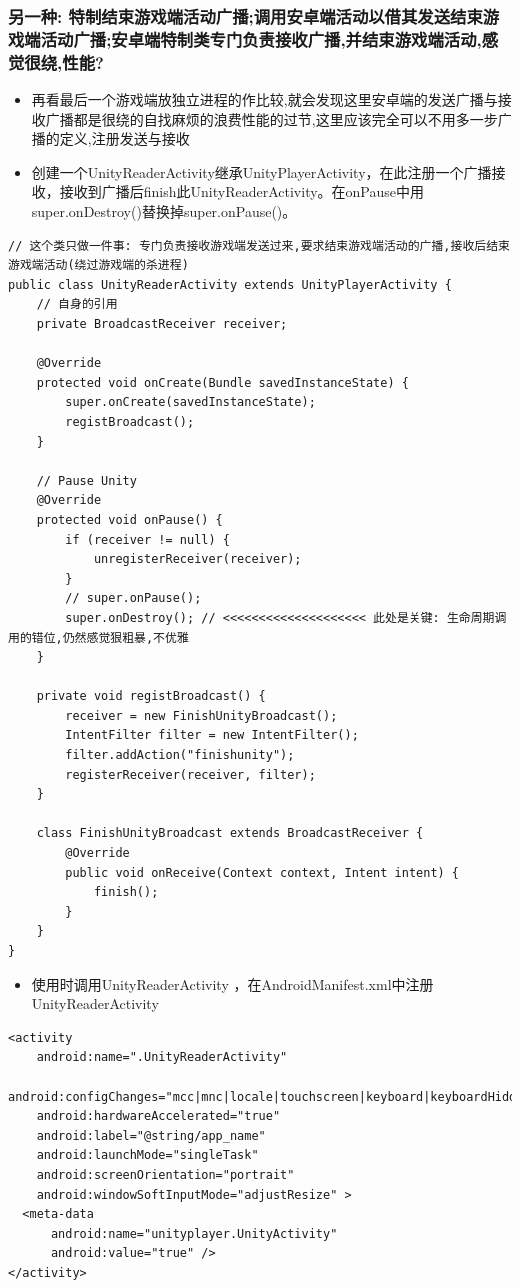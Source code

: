 \documentclass[9pt, b5paper]{article}
\begin{document}
\subsubsection{另一种: 特制结束游戏端活动广播;调用安卓端活动以借其发送结束游戏端活动广播;安卓端特制类专门负责接收广播,并结束游戏端活动,感觉很绕,性能?}
\label{sec-1-2-4}
\begin{itemize}
\item 再看最后一个游戏端放独立进程的作比较,就会发现这里安卓端的发送广播与接收广播都是很绕的自找麻烦的浪费性能的过节,这里应该完全可以不用多一步广播的定义,注册发送与接收
\item 创建一个UnityReaderActivity继承UnityPlayerActivity，在此注册一个广播接收，接收到广播后finish此UnityReaderActivity。在onPause中用super.onDestroy()替换掉super.onPause()。
\end{itemize}
\begin{verbatim}
// 这个类只做一件事: 专门负责接收游戏端发送过来,要求结束游戏端活动的广播,接收后结束游戏端活动(绕过游戏端的杀进程)
public class UnityReaderActivity extends UnityPlayerActivity {
    // 自身的引用
    private BroadcastReceiver receiver;
 
    @Override
    protected void onCreate(Bundle savedInstanceState) {
        super.onCreate(savedInstanceState);
        registBroadcast();
    }
 
    // Pause Unity
    @Override
    protected void onPause() {
        if (receiver != null) {
            unregisterReceiver(receiver);
        }
        // super.onPause();
        super.onDestroy(); // <<<<<<<<<<<<<<<<<<<< 此处是关键: 生命周期调用的错位,仍然感觉狠粗暴,不优雅
    }
  
    private void registBroadcast() {
        receiver = new FinishUnityBroadcast();
        IntentFilter filter = new IntentFilter();
        filter.addAction("finishunity");
        registerReceiver(receiver, filter);
    }
 
    class FinishUnityBroadcast extends BroadcastReceiver {
        @Override
        public void onReceive(Context context, Intent intent) {
            finish();
        }
    }
}
\end{verbatim}
\begin{itemize}
\item 使用时调用UnityReaderActivity ，在AndroidManifest.xml中注册UnityReaderActivity
\end{itemize}
\begin{verbatim}
<activity
    android:name=".UnityReaderActivity"
    android:configChanges="mcc|mnc|locale|touchscreen|keyboard|keyboardHidden|navigation|orientation|screenLayout|uiMode|screenSize|smallestScreenSize|fontScale|layoutDirection"
    android:hardwareAccelerated="true"
    android:label="@string/app_name"
    android:launchMode="singleTask"
    android:screenOrientation="portrait"
    android:windowSoftInputMode="adjustResize" >
  <meta-data
      android:name="unityplayer.UnityActivity"
      android:value="true" />
</activity>
\end{verbatim}
\end{document}
